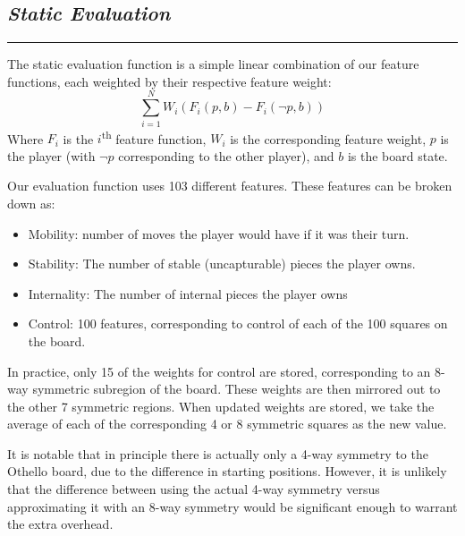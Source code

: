 \documentclass[10pt]{report}
\begin{document}
\begin{multicols}{2}
\section*{\emph{Static Evaluation}}
\hrule
The static evaluation function is a simple linear combination of our feature functions, each weighted by their respective feature weight:
\[
	\sum_{i=1}^N W_i \left(F_i(p,b) -F_i(\neg p,b) \right)
\]
Where $F_i$ is the $i$\textsuperscript{th} feature function, $W_i$ is the corresponding feature weight, $p$ is the player (with $\neg p$ corresponding to the other player), and $b$ is the board state.

Our evaluation function uses 103 different features. These features can be broken down as:
    \begin{itemize}
  \item
    Mobility: number of moves the player would have if it was their turn.
  \item
   Stability:  The number of stable (uncapturable) pieces the player owns.
  \item
   Internality: The number of internal pieces the player owns
  \item
    Control: 100 features, corresponding to control of each of the 100 squares on the board.
  \end{itemize}

In practice, only 15 of the weights for control are stored, corresponding to an 8-way symmetric subregion of the board. These weights are then mirrored out to the other 7 symmetric regions. When updated weights are stored, we take the average of each of the corresponding 4 or 8 symmetric squares as the new value.

It is notable that in principle there is actually only a 4-way symmetry to the Othello board, due to the difference in starting positions. However, it is unlikely that the difference between using the actual 4-way symmetry versus approximating it with an 8-way symmetry would be significant enough to warrant the extra overhead.


\end{multicols}
\end{document}
